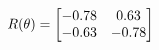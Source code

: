 \documentclass[preview]{standalone}
\begin{document}
\begin{align*}
\special{dvisvgm:raw <g id='unique000'>}R(\theta) = \begin{bmatrix}-0.78 & 0.63\\-0.63 & -0.78\end{bmatrix}\special{dvisvgm:raw </g>}
\end{align*}
\end{document}
